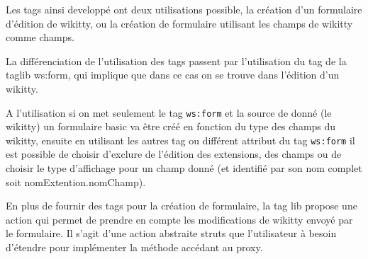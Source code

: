 Les tags ainsi developpé ont deux utilisations possible, la création d'un 
formulaire d'édition de wikitty, ou la création de formulaire utilisant les 
champs de wikitty comme champs. 

La différenciation de l'utilisation des tags passent par l'utilisation du tag 
de la taglib ws:form, qui implique que dans ce cas on se trouve dans l'édition d'un
wikitty.


A l'utilisation si on met seulement le tag \verb!ws:form! et la source de donné 
(le wikitty) un formulaire basic va être créé en fonction du type des champs
du wikitty, ensuite en utilisant les autres tag ou différent attribut du tag 
\verb!ws:form! il est possible de choisir d'exclure de l'édition des extensions,
des champs ou de choisir le type d'affichage pour un champ donné (et identifié
par son nom complet soit nomExtention.nomChamp).

En plus de fournir des tags pour la création de formulaire, la tag lib propose 
une action qui permet de prendre en compte les modifications de wikitty envoyé
par le formulaire. Il s'agit d'une action abstraite struts que l'utilisateur à 
besoin d'étendre pour implémenter la méthode accédant au proxy.








